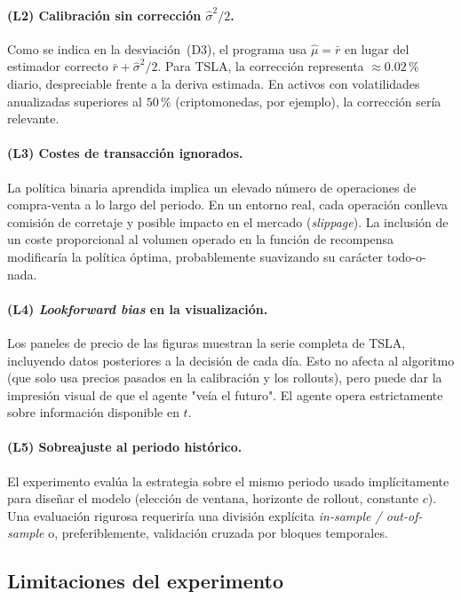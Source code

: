 \paragraph{(L2) Calibración sin corrección $\hat\sigma^2/2$.} Como se indica en la desviación~(D3), el programa usa $\hat\mu = \bar r$ en lugar del estimador correcto $\bar r + \hat\sigma^2/2$. Para TSLA, la corrección representa $\approx 0{.}02\,\%$ diario, despreciable frente a la deriva estimada. En activos con volatilidades anualizadas superiores al $50\,\%$ (criptomonedas, por ejemplo), la corrección sería relevante.

\paragraph{(L3) Costes de transacción ignorados.} La política binaria aprendida implica un elevado número de operaciones de compra-venta a lo largo del periodo. En un entorno real, cada operación conlleva comisión de corretaje y posible impacto en el mercado (\emph{slippage}). La inclusión de un coste proporcional al volumen operado en la función de recompensa modificaría la política óptima, probablemente suavizando su carácter todo-o-nada.

\paragraph{(L4) \emph{Lookforward bias} en la visualización.} Los paneles de precio de las figuras muestran la serie completa de TSLA, incluyendo datos posteriores a la decisión de cada día. Esto no afecta al algoritmo (que solo usa precios pasados en la calibración y los rollouts), pero puede dar la impresión visual de que el agente "veía el futuro". El agente opera estrictamente sobre información disponible en $t$.

\paragraph{(L5) Sobreajuste al periodo histórico.} El experimento evalúa la estrategia sobre el mismo periodo usado implícitamente para diseñar el modelo (elección de ventana, horizonte de rollout, constante $c$). Una evaluación rigurosa requeriría una división explícita \emph{in-sample / out-of-sample} o, preferiblemente, validación cruzada por bloques temporales.

\subsection{Limitaciones del experimento}
\label{subsec:limitaciones-experimento}

